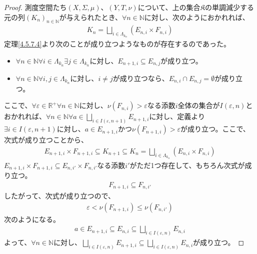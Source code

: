 \documentclass[dvipdfmx]{jsarticle}
\begin{document}
\begin{proof}
測度空間たち$(X,\varSigma,\mu)$、$(Y,T,\nu)$について、上の集合$\mathfrak{K}$の単調減少する元の列$\left( K_{n} \right)_{n \in \mathbb{N}}$が与えられたとき、$\forall n \in \mathbb{N}$に対し、次のようにおかれれば、
\begin{align*}
K_{n} = \bigsqcup_{i \in \varLambda_{k_{n}}} \left( E_{n,i} \times F_{n,i} \right)
\end{align*}
定理\ref{4.5.7.4}より次のことが成り立つようなものが存在するのであった。
\begin{itemize}
\item
  $\forall n \in \mathbb{N}\forall i \in \varLambda_{k_{n}}\exists j \in \varLambda_{k_{n}}$に対し、$E_{n + 1,i} \subseteq E_{n,j}$が成り立つ。
\item
  $\forall n \in \mathbb{N}\forall i,j \in \varLambda_{k_{n}}$に対し、$i \neq j$が成り立つなら、$E_{n,i} \cap E_{n,j} = \emptyset$が成り立つ。
\end{itemize}
ここで、$\forall\varepsilon \in \mathbb{R}^{+}\forall n \in \mathbb{N}$に対し、$\nu\left( F_{n,i} \right) > \varepsilon$なる添数$i$全体の集合が$I(\varepsilon,n)$とおかれれば、$\forall n \in \mathbb{N}\forall a \in \bigsqcup_{i \in I(\varepsilon,n + 1)} E_{n + 1,i}$に対し、定義より$\exists i \in I(\varepsilon,n + 1)$に対し、$a \in E_{n + 1,i}$かつ$\nu\left( F_{n + 1,i} \right) > \varepsilon$が成り立つ。ここで、次式が成り立つことから、
\begin{align*}
E_{n + 1,i} \times F_{n + 1,i} \subseteq K_{n + 1} \subseteq K_{n} = \bigsqcup_{i \in \varLambda_{k_{n}}} \left( E_{n,i} \times F_{n,i} \right)
\end{align*}
$E_{n + 1,i} \times F_{n + 1,i} \subseteq E_{n,i'} \times F_{n,i'}$なる添数$i'$がただ1つ存在して、もちろん次式が成り立つ。
\begin{align*}
F_{n + 1,i} \subseteq F_{n,i'}
\end{align*}
したがって、次式が成り立つので、
\begin{align*}
\varepsilon < \nu\left( F_{n + 1,i} \right) \leq \nu\left( F_{n,i'} \right)
\end{align*}
次のようになる。
\begin{align*}
a \in E_{n + 1,i} \subseteq E_{n,i} \subseteq \bigsqcup_{i \in I(\varepsilon,n)} E_{n,i}
\end{align*}
よって、$\forall n \in \mathbb{N}$に対し、$\bigsqcup_{i \in I(\varepsilon,n)} E_{n + 1,i} \subseteq \bigsqcup_{i \in I(\varepsilon,n)} E_{n,i}$が成り立つ。
\end{proof}
\end{document}
